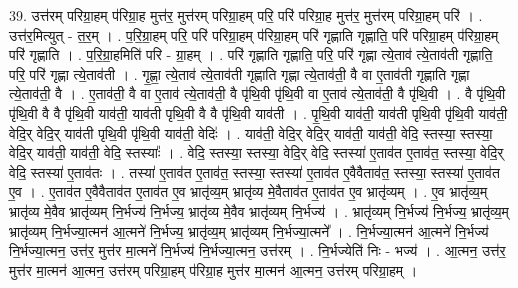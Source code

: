 \documentclass[17pt]{extarticle}
\begin{document}
39. उत्त॑रम् परिग्रा॒हम् प॑रिग्रा॒ह मुत्त॑र॒ मुत्त॑रम् परिग्रा॒हम् परि॒ परि॑ परिग्रा॒ह मुत्त॑र॒ मुत्त॑रम् परिग्रा॒हम् परि॑ । . उत्त॑र॒मित्युत् - त॒र॒म् । . प॒रि॒ग्रा॒हम् परि॒ परि॑ परिग्रा॒हम् प॑रिग्रा॒हम् परि॑ गृह्णाति गृह्णाति॒ परि॑ परिग्रा॒हम् प॑रिग्रा॒हम् परि॑ गृह्णाति । . प॒रि॒ग्रा॒हमिति॑ परि - ग्रा॒हम् । . परि॑ गृह्णाति गृह्णाति॒ परि॒ परि॑ गृह्णा त्ये॒ताव॑ त्ये॒ताव॑ती गृह्णाति॒ परि॒ परि॑ गृह्णा त्ये॒ताव॑ती । . गृ॒ह्णा॒ त्ये॒ताव॑ त्ये॒ताव॑ती गृह्णाति गृह्णा त्ये॒ताव॑ती॒ वै वा ए॒ताव॑ती गृह्णाति गृह्णा त्ये॒ताव॑ती॒ वै । . ए॒ताव॑ती॒ वै वा ए॒ताव॑ त्ये॒ताव॑ती॒ वै पृ॑थि॒वी पृ॑थि॒वी वा ए॒ताव॑ त्ये॒ताव॑ती॒ वै पृ॑थि॒वी । . वै पृ॑थि॒वी पृ॑थि॒वी वै वै पृ॑थि॒वी याव॑ती॒ याव॑ती पृथि॒वी वै वै पृ॑थि॒वी याव॑ती । . पृ॒थि॒वी याव॑ती॒ याव॑ती पृथि॒वी पृ॑थि॒वी याव॑ती॒ वेदि॒र् वेदि॒र् याव॑ती पृथि॒वी पृ॑थि॒वी याव॑ती॒ वेदिः॑ । . याव॑ती॒ वेदि॒र् वेदि॒र् याव॑ती॒ याव॑ती॒ वेदि॒ स्तस्या॒ स्तस्या॒ वेदि॒र् याव॑ती॒ याव॑ती॒ वेदि॒ स्तस्याः᳚ । . वेदि॒ स्तस्या॒ स्तस्या॒ वेदि॒र् वेदि॒ स्तस्या॑ ए॒ताव॑त ए॒ताव॑त॒ स्तस्या॒ वेदि॒र् वेदि॒ स्तस्या॑ ए॒ताव॑तः । . तस्या॑ ए॒ताव॑त ए॒ताव॑त॒ स्तस्या॒ स्तस्या॑ ए॒ताव॑त ए॒वैवैताव॑त॒ स्तस्या॒ स्तस्या॑ ए॒ताव॑त ए॒व । . ए॒ताव॑त ए॒वैवैताव॑त ए॒ताव॑त ए॒व भ्रातृ॑व्य॒म् भ्रातृ॑व्य मे॒वैताव॑त ए॒ताव॑त ए॒व भ्रातृ॑व्यम् । . ए॒व भ्रातृ॑व्य॒म् भ्रातृ॑व्य मे॒वैव भ्रातृ॑व्यम् नि॒र्भज्य॑ नि॒र्भज्य॒ भ्रातृ॑व्य मे॒वैव भ्रातृ॑व्यम् नि॒र्भज्य॑ । . भ्रातृ॑व्यम् नि॒र्भज्य॑ नि॒र्भज्य॒ भ्रातृ॑व्य॒म् भ्रातृ॑व्यम् नि॒र्भज्या॒त्मन॑ आ॒त्मने॑ नि॒र्भज्य॒ भ्रातृ॑व्य॒म् भ्रातृ॑व्यम् नि॒र्भज्या॒त्मने᳚ । . नि॒र्भज्या॒त्मन॑ आ॒त्मने॑ नि॒र्भज्य॑ नि॒र्भज्या॒त्मन॒ उत्त॑र॒ मुत्त॑र मा॒त्मने॑ नि॒र्भज्य॑ नि॒र्भज्या॒त्मन॒ उत्त॑रम् । . नि॒र्भज्येति॑ निः - भज्य॑ । . आ॒त्मन॒ उत्त॑र॒ मुत्त॑र मा॒त्मन॑ आ॒त्मन॒ उत्त॑रम् परिग्रा॒हम् प॑रिग्रा॒ह मुत्त॑र मा॒त्मन॑ आ॒त्मन॒ उत्त॑रम् परिग्रा॒हम् । \newline
\end{document}
